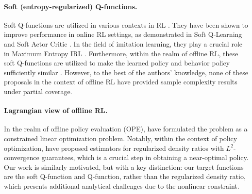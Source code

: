 \paragraph{Soft (entropy-regularized) Q-functions.} 
Soft Q-functions are utilized in various contexts in RL \citep{geist2019theory,neu2017unified}. They have been shown to improve performance in online RL settings, as demonstrated in Soft Q-Learning \citep{fox2015taming,schulman2017equivalence} and Soft Actor Critic \citep{haarnoja2018soft}. In the field of imitation learning, they play a crucial role in Maximum Entropy IRL \citep{ziebart2008maximum,ziebart2010modeling}. Furthermore, within the realm of offline RL, these soft Q-functions are utilized to make the learned policy and behavior policy sufficiently similar \citep{wu2019behavior,fakoor2021continuous}. However, to the best of the authors' knowledge, none of these proposals in the context of offline RL have provided sample complexity results under partial coverage. %


\paragraph{Lagrangian view of offline RL.}


In the realm of offline policy evaluation (OPE), \citet{nachum2020reinforcement,yang2020off,huang2022beyond} have formulated the problem as a constrained linear optimization problem. Notably, within the context of policy optimization, \citet{zhan2022offline} have proposed estimators for regularized density ratios with $L^2$-convergence guarantees, which is a crucial step in obtaining a near-optimal policy. Our work is similarly motivated, but with a key distinction: our target functions are the soft Q-function and Q-function, rather than the regularized density ratio, which presents additional analytical challenges due to the nonlinear constraint.


 